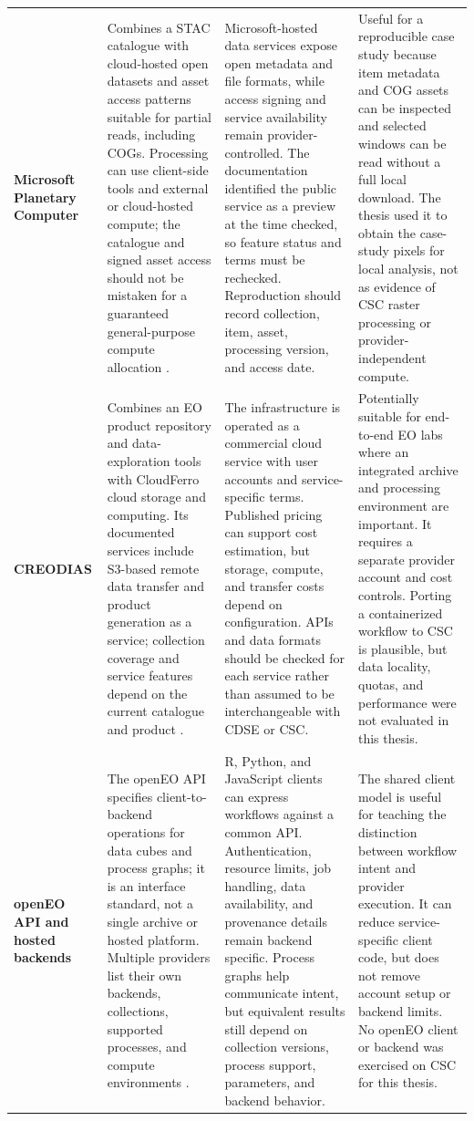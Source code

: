 \begin{longtable}{p{}p{}p{}p{}}
\textbf{Microsoft Planetary Computer} &
Combines a STAC catalogue with cloud-hosted open datasets and asset access patterns suitable
for partial reads, including COGs. Processing can use client-side tools and external or
cloud-hosted compute; the catalogue and signed asset access should not be mistaken for a
guaranteed general-purpose compute allocation \citep{pc-about,pc-s1-rtc}. &
Microsoft-hosted data services expose open metadata and file formats, while access signing
and service availability remain provider-controlled. The documentation identified the public
service as a preview at the time checked, so feature status and terms must be rechecked.
Reproduction should record collection, item, asset, processing version, and access date. &
Useful for a reproducible case study because item metadata and COG assets can be inspected
and selected windows can be read without a full local download. The thesis used it to obtain
the case-study pixels for local analysis, not as evidence of CSC raster processing or
provider-independent compute. \\

\textbf{CREODIAS} &
Combines an EO product repository and data-exploration tools with CloudFerro cloud storage
and computing. Its documented services include S3-based remote data transfer and product
generation as a service; collection coverage and service features depend on the current
catalogue and product \citep{creodias-overview}. &
The infrastructure is operated as a commercial cloud service with user accounts and
service-specific terms. Published pricing can support cost estimation, but storage, compute,
and transfer costs depend on configuration. APIs and data formats should be checked for each
service rather than assumed to be interchangeable with CDSE or CSC. &
Potentially suitable for end-to-end EO labs where an integrated archive and processing
environment are important. It requires a separate provider account and cost controls.
Porting a containerized workflow to CSC is plausible, but data locality, quotas, and
performance were not evaluated in this thesis. \\

\textbf{openEO API and hosted backends} &
The openEO API specifies client-to-backend operations for data cubes and process graphs; it
is an interface standard, not a single archive or hosted platform. Multiple providers list
their own backends, collections, supported processes, and compute environments
\citep{openeo-paper,openeo-docs,openeo-backends}. &
R, Python, and JavaScript clients can express workflows against a common API. Authentication,
resource limits, job handling, data availability, and provenance details remain backend
specific. Process graphs help communicate intent, but equivalent results still depend on
collection versions, process support, parameters, and backend behavior. &
The shared client model is useful for teaching the distinction between workflow intent and
provider execution. It can reduce service-specific client code, but does not remove account
setup or backend limits. No openEO client or backend was exercised on CSC for this thesis. \\


\end{longtable}
